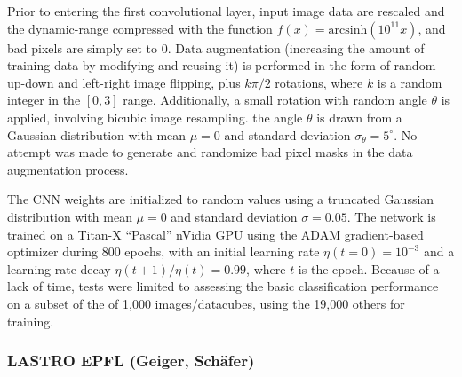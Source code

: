 \documentclass{aa}
\begin{document}
Prior to entering the first convolutional layer, input image data are rescaled and the dynamic-range compressed with the function $f(x) =
\mathrm{arcsinh} (10^{11} x)$, and bad pixels are simply set to 0.
Data augmentation (increasing the amount of training data by modifying and reusing it) is performed in the form of random up-down and left-right image flipping, plus $k\pi/2$ rotations, where $k$ is a random integer in the $[0,3]$ range. Additionally, a small rotation with random angle $\theta$ is applied, involving bicubic image resampling. the angle $\theta$ is drawn from a Gaussian distribution with mean $\mu=0$ and standard deviation $\sigma_{\theta}=5^{\circ}$. No attempt was made to generate and randomize bad pixel masks in the data augmentation process.


The CNN weights are initialized to random values using a truncated Gaussian distribution with mean $\mu=0$ and standard deviation $\sigma=0.05$. The network is trained on a Titan-X ``Pascal'' nVidia GPU using the ADAM gradient-based optimizer during 800 epochs, with an initial learning rate $\eta(t=0)=10^{-3}$ and a learning rate decay $\eta(t+1)/\eta(t)=0.99$, where $t$ is the epoch. Because of a lack of time, tests were limited to assessing the basic classification performance on a subset of the of 1,000 images/datacubes, using the 19,000 others for training.


\subsubsection{LASTRO EPFL (Geiger, Sch\"{a}fer)}
\label{sec:LASTRO}
\end{document}
